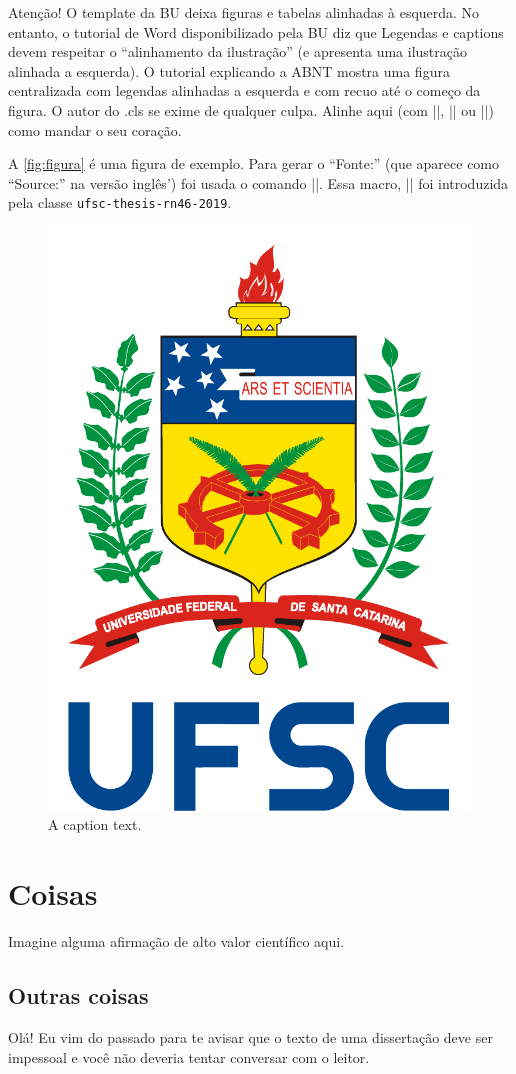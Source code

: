 \documentclass[embeddedlogo]{ufsc-thesis-rn46-2019}
\begin{document}
Atenção! O template da BU deixa figuras e tabelas alinhadas à esquerda. No entanto, o tutorial de Word disponibilizado pela BU diz que Legendas e captions devem respeitar o ``alinhamento da ilustração'' (e apresenta uma ilustração alinhada a esquerda). O tutorial explicando a ABNT mostra uma figura centralizada com legendas alinhadas a esquerda e com recuo até o começo da figura. O autor do .cls se exime de qualquer culpa. Alinhe aqui (com \mt|\centering|, \mt|\flushright| ou \mt|\flushleft|) como mandar o seu coração.

A \autoref{fig:figura} é uma figura de exemplo. Para gerar o ``Fonte:'' (que aparece como ``Source:'' na versão inglês') foi usada o comando \mt||. Essa macro, \mt|\captionsource| foi introduzida pela classe \texttt{ufsc-thesis-rn46-2019}.

\begin{figure}[t]
  \centering
  \caption{\footnotesize A caption text.}
  \label{fig:figura}

  \includegraphics[width=.5\linewidth]{ufsc.pdf}
\end{figure}

\section{Coisas}
\label{sec:stuff}
Imagine alguma afirmação de alto valor científico aqui.

\subsection{Outras coisas}
\label{sec:more}
Olá! Eu vim do passado para te avisar que o texto de uma dissertação deve ser impessoal e você não deveria tentar conversar com o leitor. 
\end{document}
